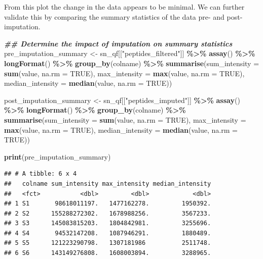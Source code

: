 \documentclass[9pt,a4paper,]{extarticle}
\newenvironment{Shaded}{\begin{snugshade}}{\end{snugshade}}
\newcommand{\AttributeTok}[1]{\textcolor[rgb]{0.13,0.29,0.53}{#1}}
\newcommand{\ConstantTok}[1]{\textcolor[rgb]{0.56,0.35,0.01}{#1}}
\newcommand{\DocumentationTok}[1]{\textcolor[rgb]{0.56,0.35,0.01}{\textbf{\textit{#1}}}}
\newcommand{\FunctionTok}[1]{\textcolor[rgb]{0.13,0.29,0.53}{\textbf{#1}}}
\newcommand{\NormalTok}[1]{#1}
\newcommand{\OtherTok}[1]{\textcolor[rgb]{0.56,0.35,0.01}{#1}}
\newcommand{\SpecialCharTok}[1]{\textcolor[rgb]{0.81,0.36,0.00}{\textbf{#1}}}
\newcommand{\StringTok}[1]{\textcolor[rgb]{0.31,0.60,0.02}{#1}}
\begin{document}
From this plot the change in the data appears to be minimal. We can further
validate this by comparing the summary statistics of the data pre- and post-
imputation.

\begin{Shaded}
\begin{Highlighting}[]
\DocumentationTok{\#\# Determine the impact of imputation on summary statistics}
\NormalTok{pre\_imputation\_summary }\OtherTok{\textless{}{-}}\NormalTok{ sn\_qf[[}\StringTok{"peptides\_filtered"}\NormalTok{]] }\SpecialCharTok{\%\textgreater{}\%}
  \FunctionTok{assay}\NormalTok{() }\SpecialCharTok{\%\textgreater{}\%}
  \FunctionTok{longFormat}\NormalTok{() }\SpecialCharTok{\%\textgreater{}\%}
  \FunctionTok{group\_by}\NormalTok{(colname) }\SpecialCharTok{\%\textgreater{}\%}
  \FunctionTok{summarise}\NormalTok{(}\AttributeTok{sum\_intensity =} \FunctionTok{sum}\NormalTok{(value, }\AttributeTok{na.rm =} \ConstantTok{TRUE}\NormalTok{),}
            \AttributeTok{max\_intensity =} \FunctionTok{max}\NormalTok{(value, }\AttributeTok{na.rm =} \ConstantTok{TRUE}\NormalTok{),}
            \AttributeTok{median\_intensity =} \FunctionTok{median}\NormalTok{(value, }\AttributeTok{na.rm =} \ConstantTok{TRUE}\NormalTok{))}

\NormalTok{post\_imputation\_summary }\OtherTok{\textless{}{-}}\NormalTok{ sn\_qf[[}\StringTok{"peptides\_imputed"}\NormalTok{]] }\SpecialCharTok{\%\textgreater{}\%}
  \FunctionTok{assay}\NormalTok{() }\SpecialCharTok{\%\textgreater{}\%}
  \FunctionTok{longFormat}\NormalTok{() }\SpecialCharTok{\%\textgreater{}\%}
  \FunctionTok{group\_by}\NormalTok{(colname) }\SpecialCharTok{\%\textgreater{}\%}
  \FunctionTok{summarise}\NormalTok{(}\AttributeTok{sum\_intensity =} \FunctionTok{sum}\NormalTok{(value, }\AttributeTok{na.rm =} \ConstantTok{TRUE}\NormalTok{),}
            \AttributeTok{max\_intensity =} \FunctionTok{max}\NormalTok{(value, }\AttributeTok{na.rm =} \ConstantTok{TRUE}\NormalTok{),}
            \AttributeTok{median\_intensity =} \FunctionTok{median}\NormalTok{(value, }\AttributeTok{na.rm =} \ConstantTok{TRUE}\NormalTok{))}

\FunctionTok{print}\NormalTok{(pre\_imputation\_summary)}
\end{Highlighting}
\end{Shaded}

\begin{verbatim}
## # A tibble: 6 x 4
##   colname sum_intensity max_intensity median_intensity
##   <fct>           <dbl>         <dbl>            <dbl>
## 1 S1       98618011197.   1477162278.         1950392.
## 2 S2      155288272302.   1678988256.         3567233.
## 3 S3      145083815203.   1804842981.         3255696.
## 4 S4       94532147208.   1087946291.         1880489.
## 5 S5      121223290798.   1307181986          2511748.
## 6 S6      143149276808.   1608003894.         3288965.
\end{verbatim}
\end{document}
